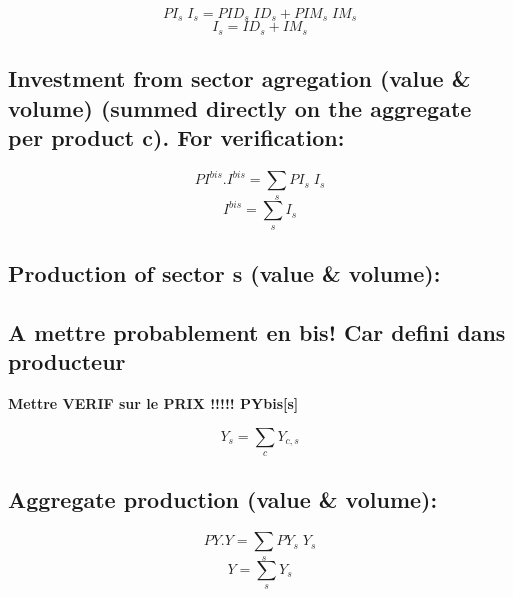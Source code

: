 \documentclass[12pt]{article}
\numberwithin{equation}{section}
\begin{document}
\begin{dmath}
PI_{s} \; I_{s} = PID_{s} \; ID_{s} + PIM_{s} \; IM_{s}
\end{dmath}
\begin{dmath}
I_{s} = ID_{s} + IM_{s}
\end{dmath}



\subsection{Investment from sector agregation (value \& volume) (summed directly on the aggregate per product c). For verification:}



\begin{dmath}
PI^{bis} . I^{bis} = \sum_{s} PI_{s} \; I_{s}
\end{dmath}
\begin{dmath}
I^{bis} = \sum_{s} I_{s}
\end{dmath}



\subsection{Production of sector s (value \& volume):}




\subsection{A mettre probablement en bis! Car defini dans producteur}


\textbf{Mettre VERIF sur le PRIX !!!!! PYbis[s]}


\begin{dmath}
Y_{s} = \sum_{c} Y_{c, s}
\end{dmath}



\subsection{Aggregate production (value \& volume):}



\begin{dmath}
PY . Y = \sum_{s} PY_{s} \; Y_{s}
\end{dmath}
\begin{dmath}
Y = \sum_{s} Y_{s}
\end{dmath}
\end{document}
